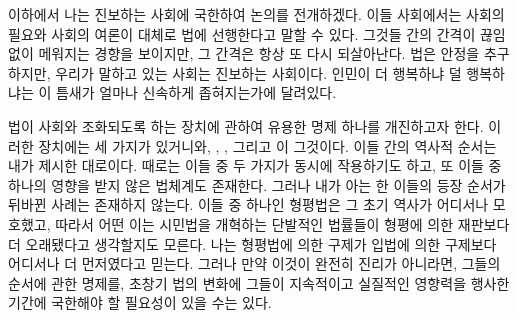 이하에서 나는 진보하는 사회에 국한하여 논의를 전개하겠다.
이들 사회에서는 사회의 필요와 사회의 여론이 대체로 법에 선행한다고
말할 수 있다.
그것들 간의 간격이 끊임없이 메워지는 경향을 보이지만,
그 간격은 항상 또 다시 되살아난다.
법은 안정을 추구하지만, 우리가 말하고 있는 사회는 진보하는 사회이다.
인민이 더 행복하냐 덜 행복하냐는 이 틈새가 얼마나 신속하게 좁혀지는가에
달려있다.

법이 사회와 조화되도록 하는 장치에 관하여 유용한 명제 하나를
개진하고자 한다.
이러한 장치에는 세 가지가 있거니와,
, ,
그리고 이 그것이다.
이들 간의 역사적 순서는 내가 제시한 대로이다.
때로는 이들 중 두 가지가 동시에 작용하기도 하고, 또
이들 중 하나의 영향을 받지 않은 법체계도 존재한다.
그러나 내가 아는 한 이들의 등장 순서가 뒤바뀐 사례는 존재하지 않는다.
이들 중 하나인 형평법은 그 초기 역사가 어디서나 모호했고,
따라서 어떤 이는 시민법을 개혁하는 단발적인 법률들이 형평에 의한 재판보다
더 오래됐다고 생각할지도 모른다.
나는 형평법에 의한 구제가 입법에 의한 구제보다 어디서나 더 먼저였다고 믿는다.
그러나 만약 이것이 완전히 진리가 아니라면,
그들의 순서에 관한 명제를,
초창기 법의 변화에 그들이 지속적이고 실질적인
영향력을 행사한 기간에
국한해야 할 필요성이 있을 수는 있다.

